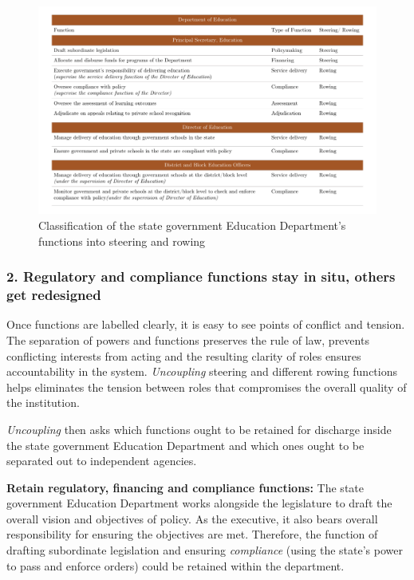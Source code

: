 \documentclass[a4paper, 12pt, twoside]{article}
\begin{document}
\begin{figure}[H]
 \centering
\includegraphics[page=1, width = 16.2cm]{figure4}
\caption{Classification of the state government Education Department’s functions into steering and rowing}
\end{figure}



\subsubsection*{2. Regulatory and compliance functions stay in situ, others get redesigned} 

Once functions are labelled clearly, it is easy to see points of conflict and tension. The separation of powers and functions preserves the rule of law, prevents conflicting interests from acting and the resulting clarity of roles ensures accountability in the system. \textit{Uncoupling} steering and different rowing functions helps eliminates the tension between roles that compromises the overall quality of the institution. 

\textit{Uncoupling} then asks which functions ought to be retained for discharge inside the state government Education Department and which ones ought to be separated out to independent agencies. 



\textbf{Retain regulatory, financing and compliance functions:} The state government Education Department works alongside the legislature to draft the overall vision and objectives of policy. As the executive, it also bears overall responsibility for ensuring the objectives are met. Therefore, the function of drafting subordinate legislation and ensuring \textit{compliance} (using the state’s power to pass and enforce orders) could be retained within the department.
\end{document}
